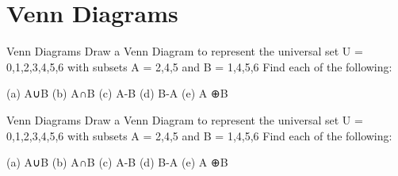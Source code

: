 \section*{Venn Diagrams}

Venn Diagrams
Draw a Venn Diagram to represent the universal set U = {0,1,2,3,4,5,6} with subsets
A = {2,4,5} and  B = {1,4,5,6}
Find each of the following:
 
(a) A∪B
(b) A∩B
(c) A-B
(d) B-A
(e) A ⊕B
 
 
 Venn Diagrams
 Draw a Venn Diagram to represent the universal set U = {0,1,2,3,4,5,6} with subsets
 A = {2,4,5} and  B = {1,4,5,6}
 Find each of the following:
 
 (a) A∪B
 (b) A∩B
 (c) A-B
 (d) B-A
 (e) A ⊕B
